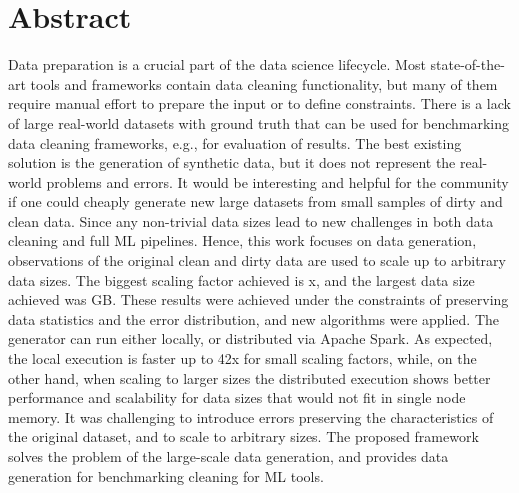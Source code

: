 \chapter*{Abstract}

Data preparation is a crucial part of the data science lifecycle.
Most state-of-the-art tools and frameworks contain data cleaning functionality, 
but many of them require manual effort to prepare the input or to define constraints.
There is a lack of large real-world datasets with ground truth that can be used for benchmarking data cleaning frameworks, e.g., for evaluation of results.
The best existing solution is the generation of synthetic data, but it does not represent the real-world problems and errors.
It would be interesting and helpful for the community if one could cheaply generate new large datasets from small samples of dirty and clean data.
Since any non-trivial data sizes lead to new challenges in both data cleaning and full ML pipelines.
Hence, this work focuses on data generation, observations of the original clean and dirty data are used to scale up to arbitrary data sizes.
The biggest scaling factor achieved is x, and the largest data size achieved was  GB.
These results were achieved under the constraints of preserving data statistics and the error distribution, and new algorithms were applied.
The generator can run either locally, or distributed via Apache Spark.
As expected, the local execution is faster up to 42x for small scaling factors, 
while, on the other hand, when scaling to larger sizes the distributed execution shows better performance and scalability for data sizes that would not fit in single node memory.  %
It was challenging to introduce errors preserving the characteristics of the original dataset, and to scale to arbitrary sizes. 
The proposed framework solves the problem of the large-scale data generation, and provides data generation for benchmarking cleaning for ML tools.


\newpage\null\thispagestyle{empty}\newpage

